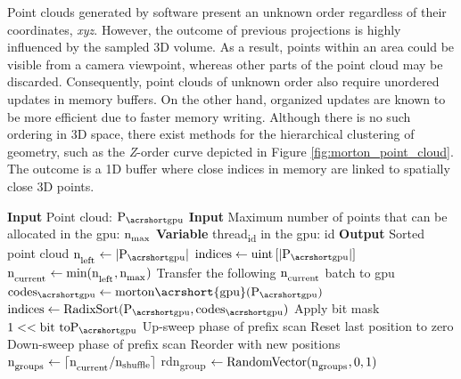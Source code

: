 Point clouds generated by software present an unknown order regardless of their coordinates, \textit{xyz}. However, the outcome of previous projections is highly influenced by the sampled 3D volume. As a result, points within an area could be visible from a camera viewpoint, whereas other parts of the point cloud may be discarded. Consequently, point clouds of unknown order also require unordered updates in memory buffers. On the other hand, organized updates are known to be more efficient due to faster memory writing. Although there is no such ordering in 3D space, there exist methods for the hierarchical clustering of geometry, such as the \textit{Z}-order curve depicted in Figure \ref{fig:morton_point_cloud}. The outcome is a 1D buffer where close indices in memory are linked to spatially close 3D points. 

\begin{algorithm}
  \small
  \begin{algorithmic}[1]
    \State \textbf{Input} Point cloud: $\Points$ %
    \State \textbf{Input} Maximum number of points that can be allocated in the \acrshort{gpu}: $\textrm{n}_\textsubscript{max}$ %
    \State \textbf{Variable} \textrm{thread}\textsubscript{id} in the \acrshort{gpu}: id %
    \State \textbf{Output} Sorted point cloud %
    \State $\LeftPoints \gets \PCCardinality$ %
    \State $\textrm{indices} \gets \textrm{uint}\left[\PCCardinality\right]$ %
        \State $\textrm{n}_\textsubscript{current} \gets \textrm{min}(\textrm{n}_\textsubscript{left}, \textrm{n}_\textsubscript{max})$ %
        \State Transfer the following $\textrm{n}_\textsubscript{current}$ batch to \acrshort{gpu} %
            \State $\Codes \gets \textrm{morton\acrshort{gpu}}(\Points)$ %
            \State $\textrm{indices} \gets \textrm{RadixSort}(\Points, \Codes)$ %
                    \State Apply bit mask $1 << \textrm{bit to} \Points$ %
                    \State Up-sweep phase of prefix scan %
                    \State Reset last position to zero %
                    \State Down-sweep phase of prefix scan %
                    \State Reorder \Points with new positions %
                \EndFor
            \EndProcedure
        \EndProcedure
                \State $\textrm{n}_\textsubscript{groups} \gets \lceil \textrm{n}_\textsubscript{current} / \textrm{n}\textsubscript{shuffle} \rceil$ %
                \State rdn\textsubscript{group} $\gets \textrm{RandomVector}(\textrm{n}_\textsubscript{groups}, 0, 1)$ %

\end{algorithmic}
\end{algorithm}
